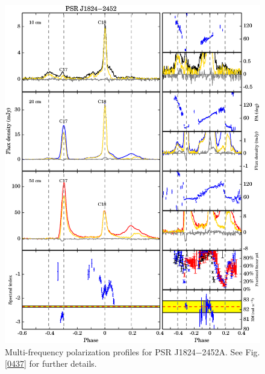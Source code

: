 \documentclass[useAMS,usenatbib]{mn2e}
\begin{document}
\begin{appendix}
\begin{figure}
\begin{center}
\includegraphics[width=6 in]{1824.ps}
\caption{Multi-frequency polarization profiles for PSR J1824$-$2452A. 
See Fig. \ref{0437} for further details.}
\label{1824}
\end{center}
\end{figure}


\end{appendix}
\end{document}
